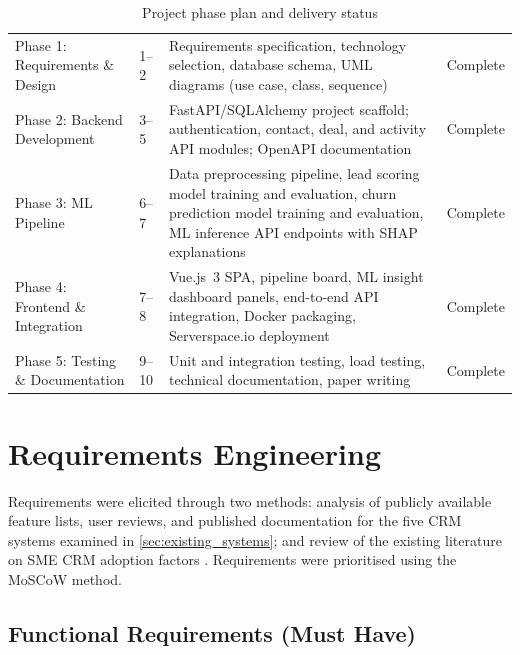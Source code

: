 \begin{table}[H]
  \centering
  \caption{Project phase plan and delivery status}
  \label{tab:phases}
  \begin{tabularx}{\textwidth}{@{}L{3.0cm} C{1.6cm} X C{1.8cm}@{}}
    \toprule
     &  &  &
     \\
    \midrule
    Phase 1: Requirements \& Design &
      1--2 &
      Requirements specification, technology selection, database schema,
      UML diagrams (use case, class, sequence) &
      Complete \\
    Phase 2: Backend Development &
      3--5 &
      FastAPI/SQLAlchemy project scaffold; authentication, contact, deal,
      and activity API modules; OpenAPI documentation &
      Complete \\
    Phase 3: ML Pipeline &
      6--7 &
      Data preprocessing pipeline, lead scoring model training and
      evaluation, churn prediction model training and evaluation,
      ML inference API endpoints with SHAP explanations &
      Complete \\
    Phase 4: Frontend \& Integration &
      7--8 &
      Vue.js~3 SPA, pipeline board, ML insight dashboard panels,
      end-to-end API integration, Docker packaging, Serverspace.io deployment &
      Complete \\
    Phase 5: Testing \& Documentation &
      9--10 &
      Unit and integration testing, load testing, technical
      documentation, paper writing &
      Complete \\
    \bottomrule
  \end{tabularx}
\end{table}
\section{Requirements Engineering}

Requirements were elicited through two methods: analysis of publicly
available feature lists, user reviews, and published documentation for the
five CRM systems examined in \cref{sec:existing_systems}; and review of
the existing literature on SME CRM adoption factors \citep{nguyen2013}.
Requirements were prioritised using the MoSCoW method.

\subsection{Functional Requirements (Must Have)}

